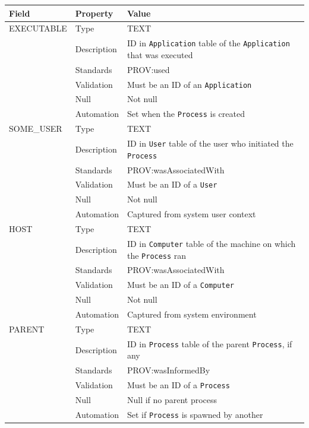 \documentclass[
]{article}
\newcounter{none}
\begin{document}
{\def\LTcaptype{none} 
\begin{longtable}[]{@{}
  >{\raggedright\arraybackslash}p{}
  >{\raggedright\arraybackslash}p{}
  >{\raggedright\arraybackslash}p{}@{}}
\toprule\noalign{}
\begin{minipage}[b]{\linewidth}\raggedright
Field
\end{minipage} & \begin{minipage}[b]{\linewidth}\raggedright
Property
\end{minipage} & \begin{minipage}[b]{\linewidth}\raggedright
Value
\end{minipage} \\
\midrule\noalign{}
\endhead
\bottomrule\noalign{}
\endlastfoot
EXECUTABLE & Type & TEXT \\
& Description & ID in \texttt{Application} table of the
\texttt{Application} that was executed \\
& Standards & PROV:used \\
& Validation & Must be an ID of an \texttt{Application} \\
& Null & Not null \\
& Automation & Set when the \texttt{Process} is created \\
SOME\_USER & Type & TEXT \\
& Description & ID in \texttt{User} table of the user who initiated the
\texttt{Process} \\
& Standards & PROV:wasAssociatedWith \\
& Validation & Must be an ID of a \texttt{User} \\
& Null & Not null \\
& Automation & Captured from system user context \\
HOST & Type & TEXT \\
& Description & ID in \texttt{Computer} table of the machine on which
the \texttt{Process} ran \\
& Standards & PROV:wasAssociatedWith \\
& Validation & Must be an ID of a \texttt{Computer} \\
& Null & Not null \\
& Automation & Captured from system environment \\
PARENT & Type & TEXT \\
& Description & ID in \texttt{Process} table of the parent
\texttt{Process}, if any \\
& Standards & PROV:wasInformedBy \\
& Validation & Must be an ID of a \texttt{Process} \\
& Null & Null if no parent process \\
& Automation & Set if \texttt{Process} is spawned by another \\
\end{longtable}
}
\end{document}
